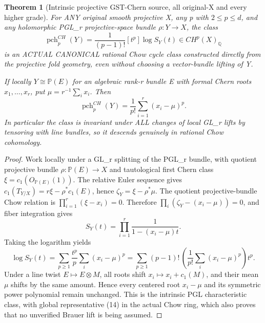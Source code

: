 \documentclass[11pt]{article}
\newtheorem{theorem}{Theorem}
\begin{document}
\begin{theorem}[Intrinsic projective GST-Chern source, all original-X and every higher grade]
For ANY original smooth projective X,
any p with $2\le p\le d$, and
any holomorphic PGL_r projective-space
bundle $\rho:Y\to X$, the class
\[
 \boxed{
 \operatorname{pch}^{CH}_p(Y)=
  \frac{1}{(p-1)!}
    [t^p]\log S_Y(t)\in CH^p(X)_\mathbb Q
 }                                                       \tag{14}
\]
is an ACTUAL CANONICAL rational Chow
cycle class constructed directly from
the projective fold geometry, even
without choosing a vector-bundle
lifting of Y.

If locally $Y\cong\mathbb P(E)$ for
an algebraic rank-r bundle E
with formal Chern roots $x_1,\dots,x_r$,
put $\mu=r^{-1}\sum_i x_i$.
Then
\[
 \boxed{
 \operatorname{pch}^{CH}_p(Y)
   =\frac1{p!}\sum_{i=1}^r
                   (x_i-\mu)^p .
 }                                                       \tag{15}
\]
In particular the class is invariant
under ALL changes of local GL_r
lifts by tensoring with line bundles,
so it descends genuinely in rational
Chow cohomology.
\end{theorem}
\begin{proof}
Work locally under a GL_r splitting
of the PGL_r bundle, with quotient
projective bundle $\rho:\mathbb P(E)\to X$
and tautological first Chern
class $\xi=c_1(O_{\mathbb P(E)}(1))$.
The relative Euler sequence gives
$c_1(T_{Y/X})=r\xi-\rho^*c_1(E)$,
hence $\zeta_Y=\xi-\rho^*\mu$.
The quotient projective-bundle
Chow relation is
$\prod_{i=1}^r(\xi-x_i)=0$.
Therefore
$\prod_i(\zeta_Y-(x_i-\mu))=0$,
and fiber integration gives
\[
 S_Y(t)=\prod_{i=1}^r
          \frac1{1-(x_i-\mu)t}.
                                                             \tag{16}
\]
Taking the logarithm yields
\[
 \log S_Y(t)=\sum_{p\ge1}
     \frac{t^p}{p}\sum_i(x_i-\mu)^p
  =\sum_{p\ge1}(p-1)!\,
     \left(\frac1{p!}\sum_i
                    (x_i-\mu)^p\right)t^p.
                                                             \tag{17}
\]
Under a line twist $E\mapsto E\otimes M$,
all roots shift $x_i\mapsto x_i+c_1(M)$,
and their mean $\mu$ shifts by the
same amount. Hence every centered
root $x_i-\mu$ and its symmetric
power polynomial remain unchanged.
This is the intrinsic PGL characteristic
class, with global representative
(14) in the actual Chow ring, which
also proves that no unverified
Brauer lift is being assumed.
\end{proof}
\end{document}
